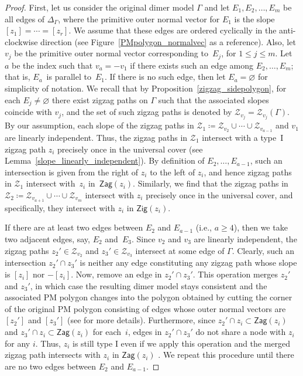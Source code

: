 \documentclass[11pt]{article}
\numberwithin{equation}{section}
\numberwithin{equation}{section}
\numberwithin{figure}{section}
\numberwithin{table}{section}
\newcommand{\calZ}{\mathcal{Z}}
\newcommand{\Zig}{\mathsf{Zig}}
\newcommand{\Zag}{\mathsf{Zag}}
\begin{document}
\begin{proof}
First, let us consider the original dimer model $\Gamma$ and let $E_1,E_2,\dots,E_m$ be all edges of $\Delta_\Gamma$, where the primitive outer normal vector for $E_1$ is the slope $[z_1]=\cdots=[z_r]$.
We assume that these edges are ordered cyclically in the anti-clockwise direction (see Figure~\ref{PMpolygon_normalvec} as a reference).
Also, let $v_j$ be the primitive outer normal vector corresponding to~$E_j$, for $1 \leq j \leq m$.
Let~$a$ be the index such that $v_a=-v_1$ if there exists such an edge among $E_2,\dots,E_m$; that is, $E_a$~is parallel to~$E_1$.
If there is no such edge, then let $E_a= \varnothing$ for simplicity of notation.
We recall that by Proposition~\ref{zigzag_sidepolygon}, for each $E_j\neq\varnothing$ there exist zigzag paths on $\Gamma$ such that the associated slopes coincide with $v_j$, and the set of such zigzag paths is denoted by $\calZ_{v_j}=\calZ_{v_j}(\Gamma)$.
By our assumption, each slope of the zigzag paths in $\calZ_1\coloneqq\calZ_{v_2}\cup\cdots\cup\calZ_{v_{a-1}}$ and $v_1$ are linearly independent.
Thus, the zigzag paths in $\calZ_1$ intersect with a type~I zigzag path $z_i$ precisely once in the universal cover (see Lemma~\ref{slope_linearly_independent}).
By definition of $E_2,\dots,E_{a-1}$, such an intersection is given from the right of $z_i$ to the left of $z_i$,
and hence zigzag paths in $\calZ_1$ intersect with~$z_i$ in~$\Zag(z_i)$.
Similarly, we find that the zigzag paths in $\calZ_2\coloneqq\calZ_{v_{a+1}}\cup\cdots\cup\calZ_{v_m}$ intersect with $z_i$ precisely once in the universal cover, and specifically, they intersect with $z_i$ in $\Zig(z_i)$.

If there are at least two edges between $E_2$ and $E_{a-1}$ (i.e., $a \geq 4$),
then we take two adjacent edges, say, $E_2$ and~$E_3$.
Since $v_2$ and $v_3$ are linearly independent, the zigzag paths $z_2'\in\calZ_{v_2}$ and $z_3'\in\calZ_{v_3}$ intersect at some edge of $\Gamma$.
Clearly, such an intersection $z_2' \cap z_3'$ is neither any edge constituting any zigzag path whose slope is $[z_i]$ nor $-[z_i]$.
Now, remove an edge in $z_2' \cap z_3'$. This operation merges $z_2'$ and $z_3'$, in which case the resulting dimer model stays consistent and the associated PM polygon
changes into the polygon obtained by cutting the corner of the original PM polygon consisting of edges whose outer normal vectors are $[z_2']$ and $[z_3']$
(see \cite[Sections~5 and 6]{Gul} for more details).
Furthermore, since $z_2' \cap z_i \subset \Zag(z_i)$ and $z_3' \cap z_i \subset \Zag(z_i)$ for each~$i$, edges in $z_2' \cap z_3'$ do not share a node with $z_i$ for any $i$.
Thus, $z_i$ is still type I even if we apply this operation and the merged zigzag path intersects with $z_i$ in $\Zag(z_i)$ .
We repeat this procedure until there are no two edges between $E_2$ and $E_{a-1}$.


\end{proof}
\end{document}
